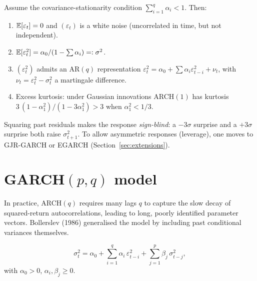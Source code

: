 \begin{propbox}
\label{prop:arch}
Assume the covariance-stationarity condition
$\sum_{i = 1}^{q} \alpha_i < 1$. Then:
\begin{enumerate}
  \item $\mathbb{E}[\varepsilon_t] = 0$ and $(\varepsilon_t)$ is a white
        noise (uncorrelated in time, but not independent).
  \item $\mathbb{E}[\varepsilon_t^2] = \alpha_0 / (1 - \sum \alpha_i)
        =: \sigma^2$.
  \item $(\varepsilon_t^2)$ admits an AR$(q)$ representation
        $\varepsilon_t^2 = \alpha_0
                          + \sum \alpha_i \varepsilon_{t-i}^2 + \nu_t$,
        with $\nu_t = \varepsilon_t^2 - \sigma_t^2$ a martingale
        difference.
  \item Excess kurtosis: under Gaussian innovations
        ARCH$(1)$ has kurtosis
        $3\,(1 - \alpha_1^2) / (1 - 3 \alpha_1^2) > 3$ when
        $\alpha_1^2 < 1/3$.
\end{enumerate}
\end{propbox}

\begin{rembox}
Squaring past residuals makes the response \emph{sign-blind}: a
$-3 \sigma$ surprise and a $+3 \sigma$ surprise both raise
$\sigma_{t+1}^2$. To allow asymmetric responses (leverage), one
moves to GJR-GARCH or EGARCH (Section~\ref{sec:extensions}).
\end{rembox}

\section{GARCH$(p, q)$ model}
\label{sec:garch}

In practice, ARCH$(q)$ requires many lags $q$ to capture the
slow decay of squared-return autocorrelations, leading to long,
poorly identified parameter vectors. Bollerslev (1986) generalised
the model by including past conditional variances themselves.

\begin{defbox}
\label{def:garch}
\[
  \sigma_t^2 = \alpha_0
              + \sum_{i = 1}^{q} \alpha_i\, \varepsilon_{t-i}^2
              + \sum_{j = 1}^{p} \beta_j\, \sigma_{t-j}^2,
\]
with $\alpha_0 > 0$, $\alpha_i, \beta_j \geq 0$.
\end{defbox}

